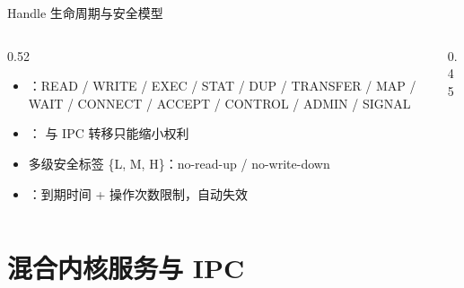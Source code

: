 \documentclass[aspectratio=1610]{beamer}
\begin{document}
\begin{frame}{Handle 生命周期与安全模型}
    \begin{columns}[t]
        \begin{column}{0.52\textwidth}
            \footnotesize
            \begin{itemize}
                \item {}：READ / WRITE / EXEC / STAT / DUP / TRANSFER / MAP / WAIT / CONNECT / ACCEPT / CONTROL / ADMIN / SIGNAL
                \item {}： 与 IPC 转移只能缩小权利
                \item {} 多级安全标签 \{L, M, H\}：no-read-up / no-write-down
                \item {}：到期时间 + 操作次数限制，自动失效
            \end{itemize}
            \vspace{0.2em}
        \end{column}
        \begin{column}{0.45\textwidth}
        \end{column}
    \end{columns}
\end{frame}

\renewcommand{\azsectionsummary}{%
    Channel/EventQ 异步 IPC：单条消息 64 KiB + 8 Handle，要么完整交付要么不交付；%
    svcmgr 崩溃自动重启 + 资源硬隔离；virtio-blk / RTC / input 已整体用户态化。}
\section{混合内核服务与 IPC}
\end{document}
